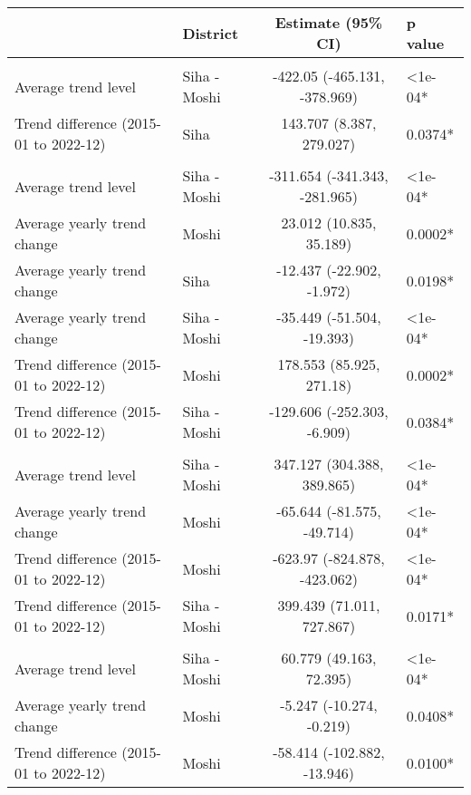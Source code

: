 \begingroup
\fontsize{12.0pt}{14.4pt}\selectfont
\begin{longtable}{l|lcl}
\toprule
 & District & Estimate (95\% CI) & p value \\ 
\midrule\addlinespace[2.5pt]
\multicolumn{4}{l}{Cardiovascular Diseases} \\[2.5pt] 
\midrule\addlinespace[2.5pt]
Average trend level & Siha - Moshi & -422.05 (-465.131, -378.969) & <1e-04* \\ 
Trend difference (2015-01 to 2022-12) & Siha & 143.707 (8.387, 279.027) & 0.0374* \\ 
\midrule\addlinespace[2.5pt]
\multicolumn{4}{l}{Diabetes Mellitus} \\[2.5pt] 
\midrule\addlinespace[2.5pt]
Average trend level & Siha - Moshi & -311.654 (-341.343, -281.965) & <1e-04* \\ 
Average yearly trend change & Moshi & 23.012 (10.835, 35.189) & 0.0002* \\ 
Average yearly trend change & Siha & -12.437 (-22.902, -1.972) & 0.0198* \\ 
Average yearly trend change & Siha - Moshi & -35.449 (-51.504, -19.393) & <1e-04* \\ 
Trend difference (2015-01 to 2022-12) & Moshi & 178.553 (85.925, 271.18) & 0.0002* \\ 
Trend difference (2015-01 to 2022-12) & Siha - Moshi & -129.606 (-252.303, -6.909) & 0.0384* \\ 
\midrule\addlinespace[2.5pt]
\multicolumn{4}{l}{Gastrointestinal Infections} \\[2.5pt] 
\midrule\addlinespace[2.5pt]
Average trend level & Siha - Moshi & 347.127 (304.388, 389.865) & <1e-04* \\ 
Average yearly trend change & Moshi & -65.644 (-81.575, -49.714) & <1e-04* \\ 
Trend difference (2015-01 to 2022-12) & Moshi & -623.97 (-824.878, -423.062) & <1e-04* \\ 
Trend difference (2015-01 to 2022-12) & Siha - Moshi & 399.439 (71.011, 727.867) & 0.0171* \\ 
\midrule\addlinespace[2.5pt]
\multicolumn{4}{l}{Infectious Eye Disease} \\[2.5pt] 
\midrule\addlinespace[2.5pt]
Average trend level & Siha - Moshi & 60.779 (49.163, 72.395) & <1e-04* \\ 
Average yearly trend change & Moshi & -5.247 (-10.274, -0.219) & 0.0408* \\ 
Trend difference (2015-01 to 2022-12) & Moshi & -58.414 (-102.882, -13.946) & 0.0100* \\ 

\end{longtable}

